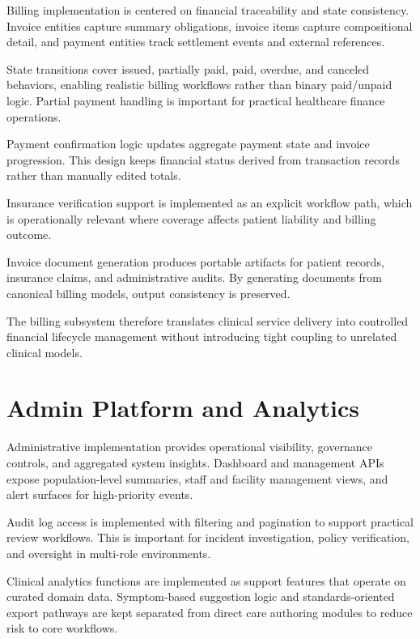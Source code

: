 Billing implementation is centered on financial traceability and state consistency. Invoice entities capture summary obligations, invoice items capture compositional detail, and payment entities track settlement events and external references.

State transitions cover issued, partially paid, paid, overdue, and canceled behaviors, enabling realistic billing workflows rather than binary paid/unpaid logic. Partial payment handling is important for practical healthcare finance operations.

Payment confirmation logic updates aggregate payment state and invoice progression. This design keeps financial status derived from transaction records rather than manually edited totals.

Insurance verification support is implemented as an explicit workflow path, which is operationally relevant where coverage affects patient liability and billing outcome.

Invoice document generation produces portable artifacts for patient records, insurance claims, and administrative audits. By generating documents from canonical billing models, output consistency is preserved.

The billing subsystem therefore translates clinical service delivery into controlled financial lifecycle management without introducing tight coupling to unrelated clinical models.

\section{Admin Platform and Analytics}\label{513-admin-platform-and-analytics}

Administrative implementation provides operational visibility, governance controls, and aggregated system insights. Dashboard and management APIs expose population-level summaries, staff and facility management views, and alert surfaces for high-priority events.

Audit log access is implemented with filtering and pagination to support practical review workflows. This is important for incident investigation, policy verification, and oversight in multi-role environments.

Clinical analytics functions are implemented as support features that operate on curated domain data. Symptom-based suggestion logic and standards-oriented export pathways are kept separated from direct care authoring modules to reduce risk to core workflows.

